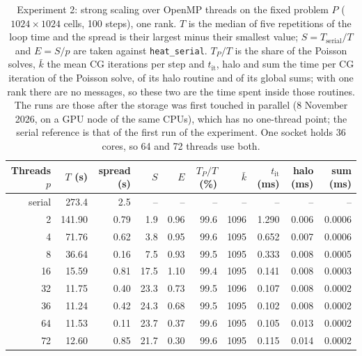 \begin{table}[htbp]
\centering
\small
\begin{tabular}{rrrrrrrrrr}
\toprule
Threads $p$ & $T$ (s) & spread (s) & $S$ & $E$ & $T_P/T$ (\%) & $\bar k$ & $t_{\mathrm{it}}$ (ms) & halo (ms) & sum (ms) \\
\midrule
serial & 273.4 & 2.5 & -- & -- & -- & -- & -- & -- & -- \\
\midrule
2 & 141.90 & 0.79 & 1.9 & 0.96 & 99.6 & 1096 & 1.290 & 0.006 & 0.0006 \\
4 & 71.76 & 0.62 & 3.8 & 0.95 & 99.6 & 1095 & 0.652 & 0.007 & 0.0006 \\
8 & 36.64 & 0.16 & 7.5 & 0.93 & 99.5 & 1095 & 0.333 & 0.008 & 0.0005 \\
16 & 15.59 & 0.81 & 17.5 & 1.10 & 99.4 & 1095 & 0.141 & 0.008 & 0.0003 \\
32 & 11.75 & 0.40 & 23.3 & 0.73 & 99.5 & 1096 & 0.107 & 0.008 & 0.0002 \\
36 & 11.24 & 0.42 & 24.3 & 0.68 & 99.5 & 1095 & 0.102 & 0.008 & 0.0002 \\
64 & 11.53 & 0.11 & 23.7 & 0.37 & 99.6 & 1095 & 0.105 & 0.013 & 0.0002 \\
72 & 12.60 & 0.85 & 21.7 & 0.30 & 99.6 & 1095 & 0.115 & 0.014 & 0.0002 \\
\bottomrule
\end{tabular}
\caption{Experiment 2: strong scaling over OpenMP threads on the fixed problem $P$ ($1024\times1024$ cells, 100 steps), one rank. $T$ is the median of five repetitions of the loop time and the spread is their largest minus their smallest value; $S=T_{\mathrm{serial}}/T$ and $E=S/p$ are taken against \texttt{heat\_serial}. $T_P/T$ is the share of the Poisson solves, $\bar k$ the mean CG iterations per step and $t_{\mathrm{it}}$, halo and sum the time per CG iteration of the Poisson solve, of its halo routine and of its global sums; with one rank there are no messages, so these two are the time spent inside those routines. The runs are those after the storage was first touched in parallel (8 November 2026, on a GPU node of the same CPUs), which has no one-thread point; the serial reference is that of the first run of the experiment. One socket holds 36 cores, so 64 and 72 threads use both.}
\label{tab:strong-openmp}
\end{table}

